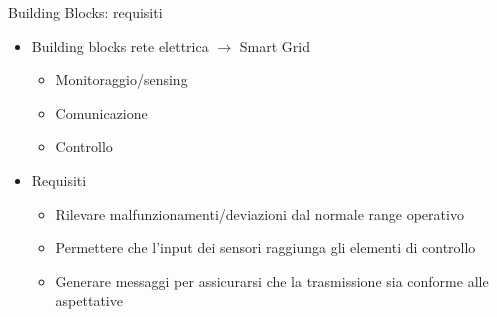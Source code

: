 \begin{frame}{Building Blocks: requisiti}
\begin{itemize}[<+- | alert@+>]
\item Building blocks rete elettrica $\rightarrow$ Smart Grid
\begin{itemize}
	\item Monitoraggio/sensing
	\item Comunicazione
	\item Controllo
\end{itemize}
\item Requisiti
\begin{itemize}
\item Rilevare malfunzionamenti/deviazioni dal normale range operativo
\item Permettere che l’input dei sensori raggiunga gli elementi di controllo
\item Generare messaggi per assicurarsi che la trasmissione sia conforme alle aspettative
\end{itemize}
\end{itemize}
\end{frame}
